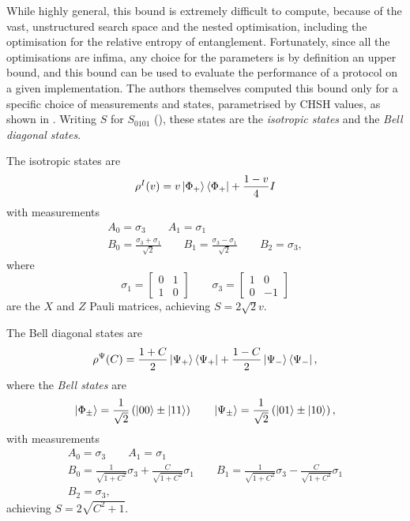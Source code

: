 \documentclass[10pt, a4paper]{article}
\numberwithin{equation}{section} %
\theoremstyle{definition}
\theoremstyle{plain}
\newcommand{\?}{\mathrel{?}} %
\begin{document}
    While highly general, this bound is extremely difficult to compute, because of the vast, unstructured search space and the nested optimisation, including the optimisation for the relative entropy of entanglement. Fortunately, since all the optimisations are infima, any choice for the parameters is by definition an upper bound, and this bound can be used to evaluate the performance of a protocol on a given implementation. The authors themselves computed this bound only for a specific choice of measurements and states, parametrised by CHSH values, as shown in . Writing \(S\) for \(S_{0101}\) (), these states are the \emph{isotropic states} and the \emph{Bell diagonal states}.

    The isotropic states are
    \begin{equation}
      \rho^{I}(v) = v\ket{\Phi_+}\bra{\Phi_+} + \frac{1-v}{4}I
    \end{equation}
    with measurements
    \begin{gather*}
      A_0 = \sigma_3 \qquad A_1 = \sigma_1 \\
      B_0 = \frac{\sigma_3 + \sigma_1}{\sqrt{2}} \qquad B_1 = \frac{\sigma_3 - \sigma_1}{\sqrt{2}} \qquad B_2 = \sigma_3,
    \end{gather*}
    where
    \[ \sigma_1 = \begin{bmatrix} 0 & 1 \\ 1 &  0 \end{bmatrix} \qquad \sigma_3 = \begin{bmatrix} 1 & 0 \\ 0 & -1 \end{bmatrix} \]
    are the \(X\) and \(Z\) Pauli matrices, achieving \(S = 2\sqrt{2}v\).

    The Bell diagonal states are
    \begin{equation}
      \rho^{\Psi}(C) = \frac{1+C}{2}\ket{\Psi_+}\bra{\Psi_+} + \frac{1-C}{2}\ket{\Psi_-}\bra{\Psi_-},
    \end{equation}
    where the \emph{Bell states} are
    \begin{equation}
      \ket{\Phi_{\pm}} = \frac{1}{\sqrt{2}}\left( \ket{00} \pm \ket{11} \right) \qquad \ket{\Psi_{\pm}} = \frac{1}{\sqrt{2}}\left( \ket{01} \pm \ket{10} \right),
    \end{equation}
    with measurements
    \begin{gather*}
      A_0 = \sigma_3 \qquad A_1 = \sigma_1 \\
      B_0 = \frac{1}{\sqrt{1+C^2}}\sigma_3 + \frac{C}{\sqrt{1+C^2}}\sigma_1 \qquad B_1 = \frac{1}{\sqrt{1+C^2}}\sigma_3 - \frac{C}{\sqrt{1+C^2}}\sigma_1 \\
      B_2 = \sigma_3,
    \end{gather*}
    achieving \(S = 2\sqrt{C^2+1}\).
\end{document}
